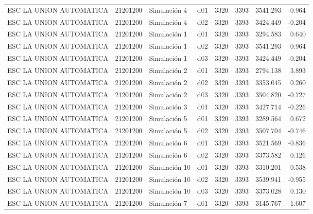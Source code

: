 \begin{landscape}
\begin{longtable}{lrlp{2cm}p{2cm}p{3cm}p{2cm}r}
\bottomrule
\endlastfoot
ESC LA UNION AUTOMATICA &  21201200 &   Simulación 4 &   d01 &      3320 &     3393 &  3541.293 &    -0.964 \\
 ESC LA UNION AUTOMATICA &  21201200 &   Simulación 4 &   d02 &      3320 &     3393 &  3424.449 &    -0.204 \\
 ESC LA UNION AUTOMATICA &  21201200 &   Simulación 1 &   d01 &      3320 &     3393 &  3294.583 &     0.640 \\
 ESC LA UNION AUTOMATICA &  21201200 &   Simulación 1 &   d02 &      3320 &     3393 &  3541.293 &    -0.964 \\
 ESC LA UNION AUTOMATICA &  21201200 &   Simulación 1 &   d03 &      3320 &     3393 &  3424.449 &    -0.204 \\
 ESC LA UNION AUTOMATICA &  21201200 &   Simulación 2 &   d01 &      3320 &     3393 &  2794.138 &     3.893 \\
 ESC LA UNION AUTOMATICA &  21201200 &   Simulación 2 &   d02 &      3320 &     3393 &  3353.045 &     0.260 \\
 ESC LA UNION AUTOMATICA &  21201200 &   Simulación 2 &   d03 &      3320 &     3393 &  3504.820 &    -0.727 \\
 ESC LA UNION AUTOMATICA &  21201200 &   Simulación 3 &   d01 &      3320 &     3393 &  3427.714 &    -0.226 \\
 ESC LA UNION AUTOMATICA &  21201200 &   Simulación 5 &   d01 &      3320 &     3393 &  3289.564 &     0.672 \\
 ESC LA UNION AUTOMATICA &  21201200 &   Simulación 5 &   d02 &      3320 &     3393 &  3507.704 &    -0.746 \\
 ESC LA UNION AUTOMATICA &  21201200 &   Simulación 6 &   d01 &      3320 &     3393 &  3521.569 &    -0.836 \\
 ESC LA UNION AUTOMATICA &  21201200 &   Simulación 6 &   d02 &      3320 &     3393 &  3373.582 &     0.126 \\
 ESC LA UNION AUTOMATICA &  21201200 &  Simulación 10 &   d01 &      3320 &     3393 &  3310.201 &     0.538 \\
 ESC LA UNION AUTOMATICA &  21201200 &  Simulación 10 &   d02 &      3320 &     3393 &  3539.941 &    -0.955 \\
 ESC LA UNION AUTOMATICA &  21201200 &  Simulación 10 &   d03 &      3320 &     3393 &  3373.028 &     0.130 \\
 ESC LA UNION AUTOMATICA &  21201200 &   Simulación 7 &   d01 &      3320 &     3393 &  3145.767 &     1.607 \\

\end{longtable}
\end{landscape}

